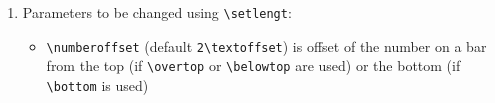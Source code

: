 \documentclass[12pt]{article}
\begin{document}
\begin{enumerate}
\begin{itemize}
          and 0 to hide the numbers on item-bars
        \item \verb+\numbercolor+ 
         (default \verb+\black\bf+) is the
          color of these numbers
        \item \verb+\placenumber+ 
          (default \verb+\belowtop+)
          determines where on the bar put the number; can be
          \verb+\belowtop+, \verb+ \overtop+, \verb+\bottom+
      \end{itemize}
%
\item Parameters to be changed using \verb+\setlengt+:
        \begin{itemize} 
        \item \verb+\numberoffset+ 
          (default \verb+2\textoffset+) is
          offset of the number on a bar
          from the top (if \verb+\overtop+ or \verb+\belowtop+
          are used) or the bottom (if \verb+\bottom+ is used)
      \end{itemize}
\end{enumerate}

\end{document}
